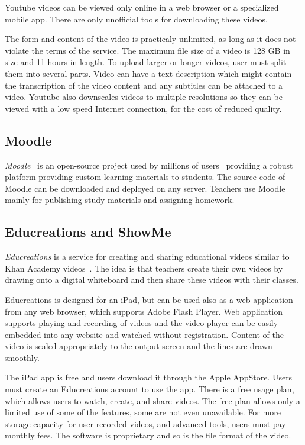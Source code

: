 Youtube videos can be viewed only online in a web browser or a specialized mobile app. There are only unofficial tools for downloading these videos.

The form and content of the video is practicaly unlimited, as long as it does not violate the terms of the service. The maximum file size of a video is 128 GB in size and 11 hours in length. To upload larger or longer videos, user must split them into several parts. Video can have a text description which might contain the transcription of the video content and any subtitles can be attached to a video. Youtube also downscales videos to multiple resolutions so they can be viewed with a low speed Internet connection, for the cost of reduced quality.



\subsection{Moodle}
\textit{Moodle}~\cite{moodle} is an open-source project used by millions of users~\cite{moodle_usage} providing a robust platform providing custom learning materials to students. The source code of Moodle can be downloaded and deployed on any server. Teachers use Moodle mainly for publishing study materials and assigning homework.



\subsection{Educreations and ShowMe}
\textit{Educreations} is a service for creating and sharing educational videos similar to Khan Academy videos~\cite{educreations}. The idea is that teachers create their own videos by drawing onto a digital whiteboard and then share these videos with their classes.

Educreations is designed for an iPad, but can be used also as a web application from any web browser, which supports Adobe Flash Player. Web application supports playing and recording of videos and the video player can be easily embedded into any website and watched without registration. Content of the video is scaled appropriately to the output screen and the lines are drawn smoothly.

The iPad app is free and users download it through the Apple AppStore. Users must create an Educreations account to use the app. There is a free usage plan, which allows users to watch, create, and share videos. The free plan allows only a limited use of some of the features, some are not even unavailable. For more storage capacity for user recorded videos, and advanced tools, users must pay monthly fees. The software is proprietary and so is the file format of the video.

